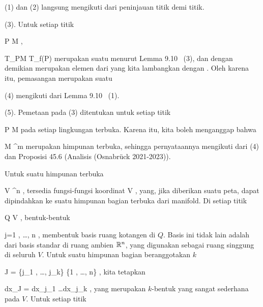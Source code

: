 {

\teilbeweis {}{}{}
{(1) dan (2) langsung mengikuti dari peninjauan titik demi titik.}
{} \teilbeweis {}{}{}
{(3). Untuk setiap titik

\mavergleichskette
{\vergleichskette
{ P
}
{ \in }{ M
}
{  }{
}
{    }{
}
{   }{
}
}
{}{}{},

 { T_PM } { T_{f(P)} \R \cong \R
} {}
merupakan suatu
menurut Lemma 9.10  (3),
dan dengan demikian merupakan elemen dari
 yang kita lambangkan dengan
. Oleh karena itu, pemasangan
 merupakan suatu
}
{}
\teilbeweis {}{}{}
{(4) mengikuti dari
Lemma 9.10  (1).}
{}
\teilbeweis {}{}{}
{(5). Pemetaan pada (3) ditentukan untuk setiap titik

\mavergleichskette
{\vergleichskette
{ P
}
{ \in }{ M
}
{  }{
}
{    }{
}
{   }{
}
}
{}{}{}
pada setiap lingkungan terbuka. Karena itu, kita boleh menganggap bahwa

\mavergleichskette
{\vergleichskette
{ M
}
{ \subseteq }{ \R^m
}
{  }{
}
{    }{
}
{   }{
}
}
{}{}{}
merupakan himpunan terbuka, sehingga pernyataannya mengikuti dari (4) dan
Proposisi 45.6 (Analisis (Osnabrück 2021-2023)).}
{}

}

Untuk suatu himpunan terbuka

\mavergleichskette
{\vergleichskette
{ V
}
{ \subseteq }{ \R^n
}
{  }{
}
{    }{
}
{   }{
}
}
{}{}{},
tersedia fungsi-fungsi koordinat
 {V} {\R
} {},
yang, jika diberikan suatu peta, dapat dipindahkan ke suatu himpunan bagian terbuka dari manifold. Di setiap titik

\mavergleichskette
{\vergleichskette
{ Q
}
{ \in }{ V
}
{  }{
}
{    }{
}
{   }{
}
}
{}{}{},
bentuk-bentuk

 {}
 {j=1 , \ldots , n} {}
 {} {} {} {,}
membentuk basis ruang kotangen di $Q$. Basis ini tidak lain adalah
dari basis standar di ruang ambien ${\mathbb R}^n$, yang digunakan sebagai ruang singgung di seluruh $V$. Untuk suatu himpunan bagian beranggotakan $k$

\mavergleichskettedisp
{\vergleichskette
{ J
}
{ =} { \{j_1 , \ldots , j_k\}
}
{ \subseteq} { \{1 , \ldots , n\}
}
{ } {
}
{ } {
}
}
{}{}{},
kita tetapkan

\mavergleichskettedisp
{\vergleichskette
{  dx_J
}
{ =} {  dx_{j_1} \wedge \ldots \wedge dx_{j_k}
}
{ } {
}
{ } {
}
{ } {
}
}
{}{}{,}
yang merupakan $k$-bentuk yang sangat sederhana pada $V$. Untuk setiap titik

